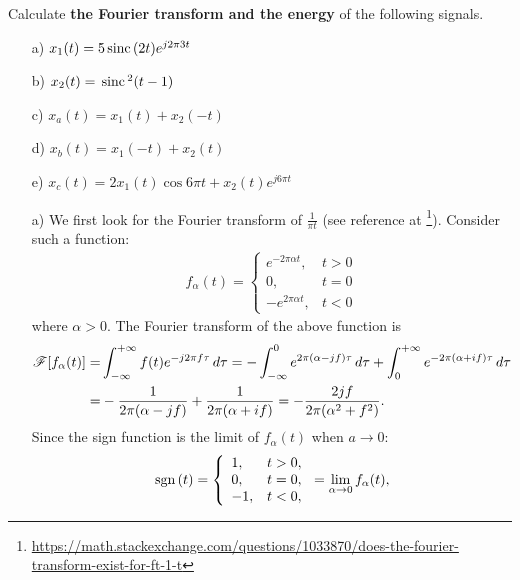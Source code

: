 \documentclass{assignment}
\begin{document}
\begin{prob}[20 pts]
    Calculate \textbf{the Fourier transform and the energy} of the following signals.
    \begin{itemize}
        \item[a)] $x_1(t)=5\,\text{sinc}\,(2t)e^{j2\pi 3t}$
        \item[b)] $x_2(t)=\,\text{sinc}\,^2(t-1)$
        \item[c)] $x_a(t)=x_1(t)+x_2(-t)$
        \item[d)] $x_b(t)=x_1(-t)+x_2(t)$
        \item[e)] $x_c(t)=2x_1(t)\cos 6\pi t+x_2(t)e^{j6\pi t}$
    \end{itemize}
\end{prob}
\begin{sol}
    \begin{itemize}
        \item[a)] We first look for the Fourier transform of $\frac{1}{\pi t}$ (see reference at \footnote{\url{https://math.stackexchange.com/questions/1033870/does-the-fourier-transform-exist-for-ft-1-t}}). Consider such a function:
        \begin{align}
            f_{\alpha}(t)=\left\{\begin{array}{ll}
                e^{-2\pi\alpha t},&t>0\\
                0,&t=0\\
                -e^{2\pi\alpha t},&t<0
            \end{array}\right.
        \end{align}
        where $\alpha>0$. The Fourier transform of the above function is
        \begin{align}
            \notag\mathscr{F}[f_{\alpha}(t)]=&\int_{-\infty}^{+\infty}f(t)e^{-j2\pi f\tau}\,d\tau=-\int_{-\infty}^0e^{2\pi(\alpha-jf)\tau}\,d\tau+\int_0^{+\infty}e^{-2\pi(\alpha+if)\tau}\,d\tau\\
            =&-\frac{1}{2\pi(\alpha-jf)}+\frac{1}{2\pi(\alpha+if)}=-\frac{2jf}{2\pi(\alpha^2+f^2)}.
        \end{align}
        Since the sign function is the limit of $f_{\alpha}(t)$ when $a\rightarrow 0$:
        \begin{align}
            \sgn(t)=\left\{\begin{array}{ll}
                1,&t>0,\\
                0,&t=0,\\
                -1,&t<0,
            \end{array}\right.=\lim_{\alpha\rightarrow 0}f_{\alpha}(t),

\end{align}
\end{itemize}
\end{sol}
\end{document}
